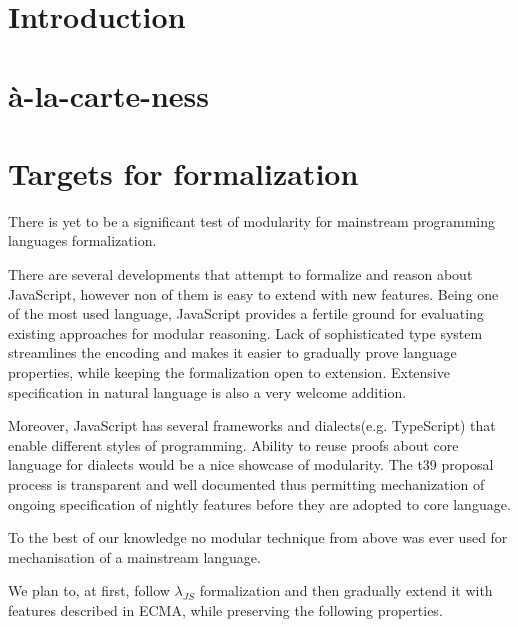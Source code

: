 \documentclass[sigplan,nonacm]{acmart}
\begin{document}
\section{Introduction}


\section{à-la-carte-ness}


\section{Targets for formalization}


There is yet to be a significant test of modularity for mainstream programming languages formalization.

There are several\cite{guha2010essence}\cite{bodin2014trusted} developments that attempt to formalize and reason about JavaScript, however non of them is easy to extend with new features.
Being one of the most used language, JavaScript provides a fertile ground for evaluating existing approaches for modular reasoning. 
Lack of sophisticated type system streamlines the encoding and makes it easier to gradually prove language properties, while keeping the formalization open to extension.
Extensive specification\cite{ECMA} in natural language is also a very welcome addition.

Moreover, JavaScript has several frameworks\cite{React} and dialects(e.g. TypeScript) that enable different styles of programming. 
Ability to reuse proofs about core language for dialects would be a nice showcase of modularity. 
The t39 proposal process\cite{t39} is transparent and well documented thus permitting mechanization of ongoing specification of nightly features before they are adopted to core language.

To the best of our knowledge no modular technique from above was ever used for mechanisation of a mainstream language.

We plan to, at first, follow $\lambda_{JS}$\cite{guha2010essence} formalization and then gradually extend it with features described in ECMA, while preserving the following properties.
\end{document}
